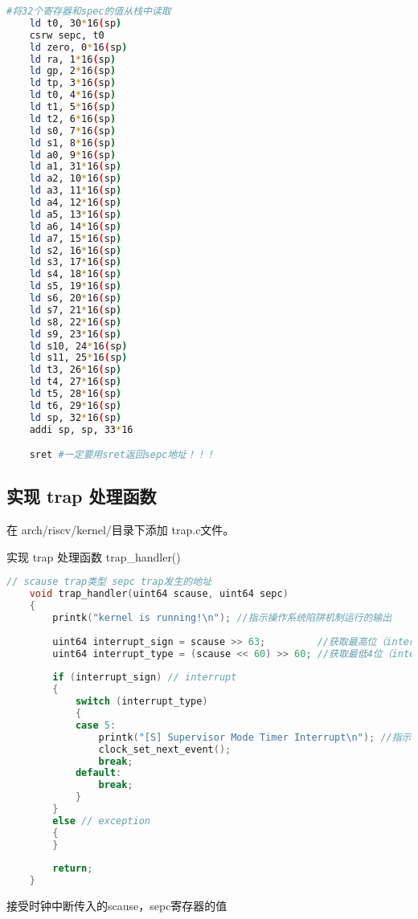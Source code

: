 \documentclass{source/Report}
\begin{document}
\begin{lstlisting}[language = bash, title = {恢复上下文}]
    #将32个寄存器和spec的值从栈中读取
    ld t0, 30*16(sp)
    csrw sepc, t0
    ld zero, 0*16(sp)
    ld ra, 1*16(sp)
    ld gp, 2*16(sp)
    ld tp, 3*16(sp)
    ld t0, 4*16(sp)
    ld t1, 5*16(sp)
    ld t2, 6*16(sp)
    ld s0, 7*16(sp)
    ld s1, 8*16(sp)
    ld a0, 9*16(sp)
    ld a1, 31*16(sp)
    ld a2, 10*16(sp)
    ld a3, 11*16(sp)
    ld a4, 12*16(sp)
    ld a5, 13*16(sp)
    ld a6, 14*16(sp)
    ld a7, 15*16(sp)
    ld s2, 16*16(sp)
    ld s3, 17*16(sp)
    ld s4, 18*16(sp)
    ld s5, 19*16(sp)
    ld s6, 20*16(sp)
    ld s7, 21*16(sp)
    ld s8, 22*16(sp)
    ld s9, 23*16(sp)
    ld s10, 24*16(sp)
    ld s11, 25*16(sp)
    ld t3, 26*16(sp)
    ld t4, 27*16(sp)
    ld t5, 28*16(sp)
    ld t6, 29*16(sp)
    ld sp, 32*16(sp)
    addi sp, sp, 33*16

    sret #一定要用sret返回sepc地址！！！
\end{lstlisting}

\subsection{实现 trap 处理函数}

在 arch/riscv/kernel/目录下添加 trap.c文件。

实现 trap 处理函数 trap\_handler()

\begin{lstlisting}[language = c, title = {trap\_handler}]
    // scause trap类型 sepc trap发生的地址
    void trap_handler(uint64 scause, uint64 sepc)
    {
        printk("kernel is running!\n"); //指示操作系统陷阱机制运行的输出
    
        uint64 interrupt_sign = scause >> 63;         //获取最高位（interrupt指示位）的值
        uint64 interrupt_type = (scause << 60) >> 60; //获取最低4位（interrupt类型指示位）的值
    
        if (interrupt_sign) // interrupt
        {
            switch (interrupt_type)
            {
            case 5:
                printk("[S] Supervisor Mode Timer Interrupt\n"); //指示发生时钟中断的输出
                clock_set_next_event();
                break;
            default:
                break;
            }
        }
        else // exception
        {
        }
    
        return;
    }
\end{lstlisting}

接受时钟中断传入的scause，sepc寄存器的值
\end{document}
